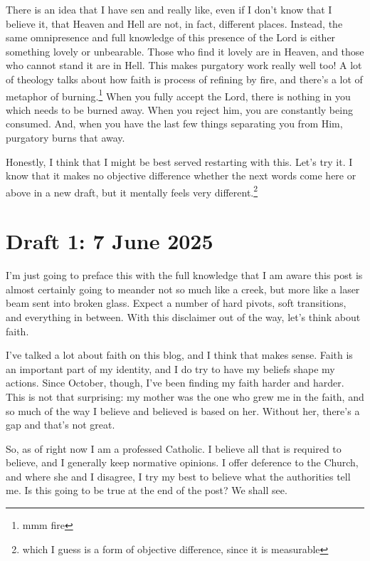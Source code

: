 \documentclass[12pt]{article}
\renewcommand{\,}{\textsuperscript{,}}
\begin{document}
There is an idea that I have sen and really like, even if I don't know that I believe it, that Heaven and Hell are not, in fact, different places.  
Instead, the same omnipresence and full knowledge of this presence of the Lord is either something lovely or unbearable.  
Those who find it lovely are in Heaven, and those who cannot stand it are in Hell.  
This makes purgatory work really well too!  
A lot of theology talks about how faith is process of refining by fire, and there's a lot of metaphor of burning.\footnote{mmm fire}  
When you fully accept the Lord, there is nothing in you which needs to be burned away.  
When you reject him, you are constantly being consumed.  
And, when you have the last few things separating you from Him, purgatory burns that away.

Honestly, I think that I might be best served restarting with this.  
Let's try it.  
I know that it makes no objective difference whether the next words come here or above in a new draft, but it mentally feels very different.\footnote{which I guess is a form of objective difference, since it is measurable}

\section{Draft 1: 7 June 2025}

I'm just going to preface this with the full knowledge that I am aware this post is almost certainly going to meander not so much like a creek, but more like a laser beam sent into broken glass.  
Expect a number of hard pivots, soft transitions, and everything in between.  
With this disclaimer out of the way, let's think about faith.

I've talked a lot about faith on this blog, and I think that makes sense.  
Faith is an important part of my identity, and I do try to have my beliefs shape my actions.  
Since October, though, I've been finding my faith harder and harder.  
This is not that surprising: my mother was the one who grew me in the faith, and so much of the way I believe and believed is based on her.  
Without her, there's a gap and that's not great.

So, as of right now I am a professed Catholic.  
I believe all that is required to believe, and I generally keep normative opinions.  
I offer deference to the Church, and where she and I disagree, I try my best to believe what the authorities tell me.  
Is this going to be true at the end of the post?  
We shall see.
\end{document}
